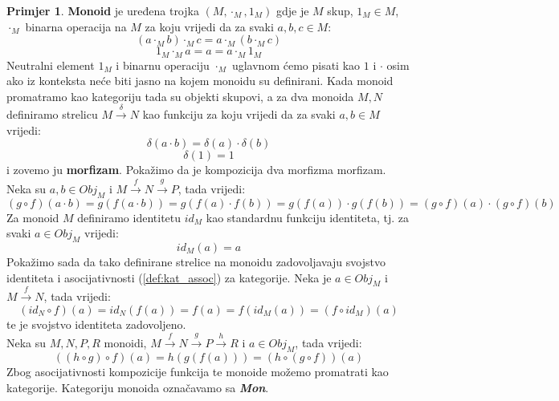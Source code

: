 \documentclass[11pt]{article}
\newcommand{\category}[1]{\textbf{\emph{#1}}}
\theoremstyle{definition}
\newtheorem{primjer}{Primjer}
\begin{document}
  \begin{primjer}
    \textbf{Monoid} je uređena trojka $(M, \cdot_M, 1_M)$ gdje je $M$ skup, $1_M
    \in M$, $\cdot_M$ binarna operacija na $M$ za koju vrijedi da za svaki $a, b, c \in M$:
    \begin{equation*}
      (a \cdot_M b) \cdot_M c = a \cdot_M (b \cdot_M c)
    \end{equation*}
    \begin{equation*}
      1_M \cdot_M a = a = a \cdot_M 1_M
    \end{equation*}
    Neutralni element $1_M$ i binarnu operaciju $\cdot_M$ uglavnom ćemo pisati
    kao $1$ i $\cdot$ osim ako iz konteksta neće biti jasno na kojem monoidu
    su definirani.
    Kada monoid promatramo kao kategoriju tada su objekti skupovi, a
    za dva monoida $M, N$ definiramo strelicu $M \xrightarrow{\delta} N$ kao
    funkciju za koju vrijedi da za svaki $a, b \in M$ vrijedi:
    \begin{equation*}
      \delta(a \cdot b) = \delta(a) \cdot \delta(b)
    \end{equation*}
    \begin{equation*}
      \delta(1) = 1
    \end{equation*}
    i zovemo ju \textbf{morfizam}.
    Pokažimo da je kompozicija dva morfizma morfizam.
    Neka su $a, b \in Obj_M$ i $M \xrightarrow{f} N \xrightarrow{g} P$, tada vrijedi:
    \begin{equation*}
      (g \circ f)(a \cdot b) = g(f(a \cdot b)) = g(f(a) \cdot f(b)) = g(f(a))
      \cdot g(f(b)) = (g \circ f)(a) \cdot (g \circ f)(b)
    \end{equation*}
    Za monoid $M$ definiramo identitetu $id_M$ kao standardnu funkciju
    identiteta, tj. za svaki $a \in Obj_M$ vrijedi:
    \begin{equation*}
      id_M(a) = a
    \end{equation*}
    Pokažimo sada da tako definirane strelice na monoidu zadovoljavaju
    svojstvo identiteta i asocijativnosti (\ref{def:kat_assoc}) za kategorije.
    Neka je $a \in Obj_M$ i $M \xrightarrow{f} N$, tada vrijedi:
    \begin{equation*}
      (id_N \circ f)(a) = id_N(f(a)) = f(a) = f(id_M(a)) = (f \circ id_M)(a)
    \end{equation*}
    te je svojstvo identiteta zadovoljeno.\\
    Neka su $M, N, P, R$ monoidi, $M \xrightarrow{f} N \xrightarrow{g} P \xrightarrow{h} R$
    i $a \in Obj_M$, tada vrijedi:
    \begin{equation*}
      ((h \circ g) \circ f)(a) = h(g(f(a))) = (h \circ (g \circ f))(a)
    \end{equation*}
    Zbog asocijativnosti kompozicije funkcija te monoide možemo promatrati kao
    kategorije. Kategoriju monoida označavamo sa \category{Mon}.
  \end{primjer}
\end{document}

